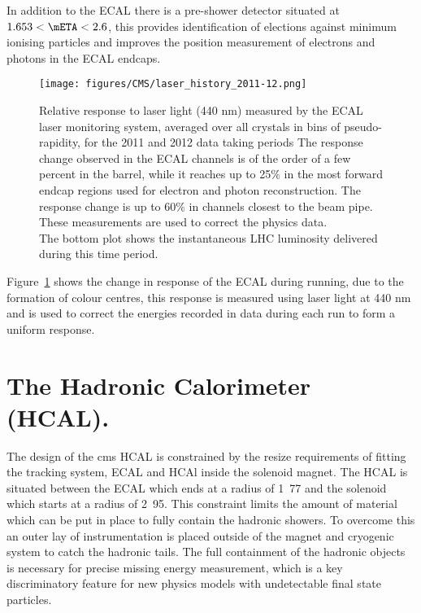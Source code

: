 In addition to the ECAL there is a pre-shower detector situated at $1.653 < 
\mETA < 2.6$, this provides identification of elections against minimum 
ionising particles and improves the position measurement of electrons and 
photons in the ECAL endcaps.
\begin{figure}[ht]
  \centering
    \texttt{[image: figures/CMS/laser\_history\_2011-12.png]}
  \caption{Relative response to laser light (440 nm) measured by the ECAL laser 
monitoring system, averaged over all crystals in bins of pseudo-rapidity, for 
the 2011 and 2012 data taking periods 
The response change observed in the ECAL channels is of the order of a few 
percent in the barrel, while it reaches up to 25$\%$ in the most forward endcap 
regions used for electron and photon reconstruction. The response change is up 
to 60$\%$ in channels closest to the beam pipe. These measurements are used to 
correct the physics data. \\ The bottom plot shows the instantaneous LHC 
luminosity delivered during this time period.\cite{CMS-DP-2012-015}}
  \label{fig:figures_CMS_laser_history_2011-12}
\end{figure}

Figure~\ref{fig:figures_CMS_laser_history_2011-12} shows the change in response 
of the ECAL during running, due to the formation of colour centres, this 
response is measured using laser light at 440 nm and is used to correct the 
energies recorded in data during each run to form a uniform response.


\section{The Hadronic Calorimeter (HCAL).} %
\label{sec:the_hadronic_calorimeter}
The design of the \ac{cms} HCAL is constrained by the resize requirements of 
fitting the tracking system, ECAL and HCAl inside the solenoid magnet. The HCAL 
is situated between the ECAL which ends at a radius of \unit{1.77}{\meter} and 
the solenoid which starts at a radius of \unit{2.95}{\meter}. This constraint 
limits the amount of material which can be put in place to fully contain the 
hadronic showers. To overcome this an outer lay of instrumentation is placed 
outside of the magnet and cryogenic system to catch the hadronic tails. The 
full containment of the hadronic objects is necessary for precise missing 
energy measurement, which is a key discriminatory feature for new physics 
models with undetectable final state particles.

